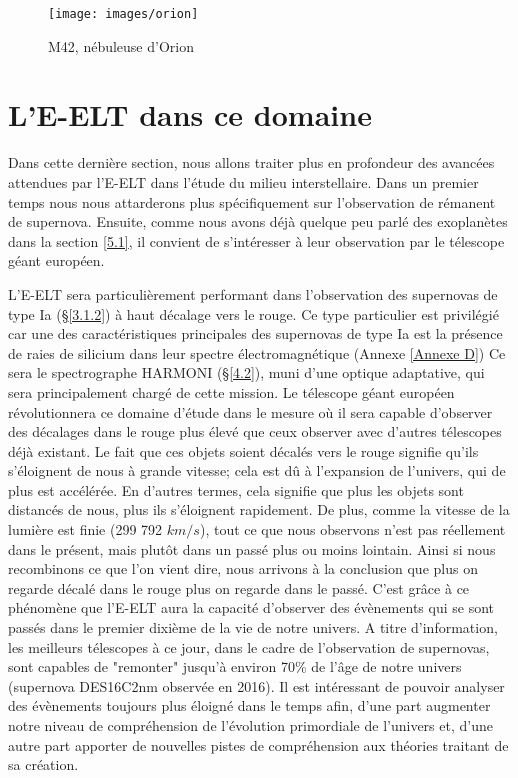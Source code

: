 \begin{figure}[H]
	\centering
	\texttt{[image: images/orion]}
	\caption[M42, nébuleuse d'Orion - astrophoto prise par René Lemoine en 2018 avec une lunette TS APO 80 et une caméra QHY10 (5 heures de pose)]{M42, nébuleuse d'Orion}
	\label{Fig. 5.1}
\end{figure}\bigskip



\section{ L'E-ELT dans ce domaine}\label{5.2}

Dans cette dernière section, nous allons traiter plus en profondeur des avancées attendues par l'E-ELT dans l'étude du milieu interstellaire. Dans un premier temps nous nous attarderons plus spécifiquement sur l'observation de rémanent de supernova. Ensuite, comme nous avons déjà quelque peu parlé des exoplanètes dans la section \ref{5.1}, il convient de s'intéresser à leur observation par le télescope géant européen.\medskip

L'E-ELT sera particulièrement performant dans l'observation des supernovas de type Ia (§\ref{3.1.2}) à haut décalage vers le rouge. Ce type particulier est privilégié car une des caractéristiques principales des supernovas de type Ia est la présence de raies de silicium dans leur spectre électromagnétique (Annexe \ref{Annexe D}) Ce sera le spectrographe HARMONI (§\ref{4.2}), muni d'une optique adaptative, qui sera principalement chargé de cette mission. Le télescope géant européen révolutionnera ce domaine d'étude dans le mesure où il sera capable d'observer des décalages dans le rouge plus élevé que ceux observer avec d'autres télescopes déjà existant. Le fait que ces objets soient décalés vers le rouge signifie qu'ils s'éloignent de nous à grande vitesse; cela est dû à l'expansion de l'univers, qui de plus est accélérée. En d'autres termes, cela signifie que plus les objets sont distancés de nous, plus ils s'éloignent rapidement. De plus, comme la vitesse de la lumière est finie (299 792 $km/s$), tout ce que nous observons n'est pas réellement dans le présent, mais plutôt dans un passé plus ou moins lointain. Ainsi si nous recombinons ce que l'on vient dire, nous arrivons à la conclusion que plus on regarde décalé dans le rouge plus on regarde dans le passé. C'est grâce à ce phénomène que l'E-ELT aura la capacité d'observer des évènements qui se sont passés dans le premier dixième de la vie de notre univers. A titre d'information, les meilleurs télescopes à ce jour, dans le cadre de l'observation de supernovas, sont capables de "remonter" jusqu'à environ 70\% de l'âge de notre univers (supernova DES16C2nm observée en 2016). Il est intéressant de pouvoir analyser des évènements toujours plus éloigné dans le temps afin, d'une part augmenter notre niveau de compréhension de l'évolution primordiale de l'univers et, d'une autre part apporter de nouvelles pistes de compréhension aux théories traitant de sa création.\medskip

